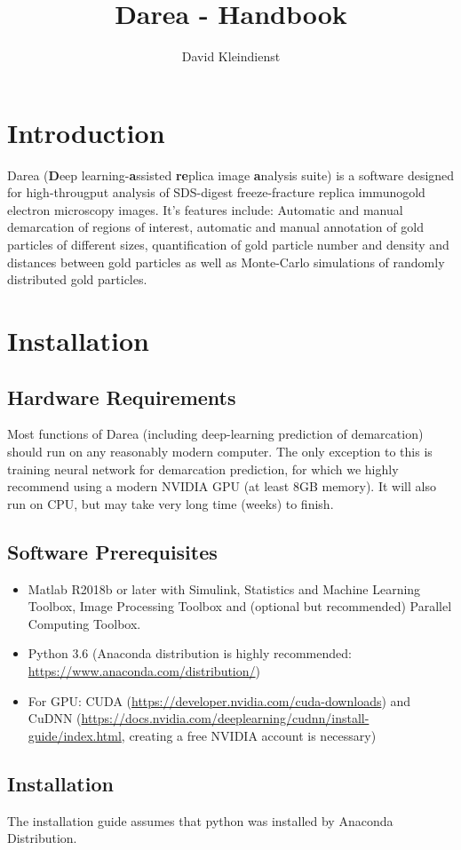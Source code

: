 \documentclass[12pt, a4paper]{scrartcl}
\author{David Kleindienst}
\title{Darea - Handbook}
\begin{document}
\maketitle
\section{Introduction}
Darea (\textbf{D}eep learning-\textbf{a}ssisted \textbf{re}plica image \textbf{a}nalysis suite) is a software designed for high-througput analysis of SDS-digest freeze-fracture replica immunogold electron microscopy images. It's features include: Automatic and manual demarcation of regions of interest, automatic and manual annotation of gold particles of different sizes, quantification of gold particle number and density and distances between gold particles as well as Monte-Carlo simulations of randomly distributed gold particles.

\tableofcontents
\section{Installation}
\subsection{Hardware Requirements}
Most functions of Darea (including deep-learning prediction of demarcation) should run on any reasonably modern computer. The only exception to this is training neural network for demarcation prediction, for which we highly recommend using a modern NVIDIA GPU (at least 8GB memory). It will also run on CPU, but may take very long time (weeks) to finish.
\subsection{Software Prerequisites}
\begin{itemize}
\item Matlab R2018b or later with Simulink, Statistics and Machine Learning Toolbox, Image Processing Toolbox and (optional but recommended) Parallel Computing Toolbox.
\item Python 3.6 (Anaconda distribution is highly recommended: \url{https://www.anaconda.com/distribution/})
\item For GPU: CUDA (\url{https://developer.nvidia.com/cuda-downloads}) and CuDNN (\url{https://docs.nvidia.com/deeplearning/cudnn/install-guide/index.html}, creating a free NVIDIA account is necessary)
\end{itemize}
\subsection{Installation}
The installation guide assumes that python was installed by Anaconda Distribution.
\end{document}
